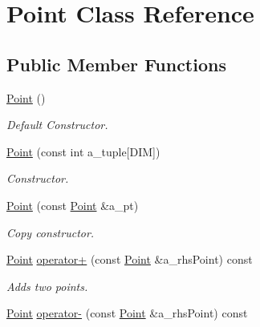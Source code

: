 \hypertarget{classPoint}{}\section{Point Class Reference}
\label{classPoint}
\subsection*{Public Member Functions}
\begin{DoxyCompactItemize}
\item 
\hypertarget{classPoint_ad92f2337b839a94ce97dcdb439b4325a}{}\hyperlink{classPoint_ad92f2337b839a94ce97dcdb439b4325a}{Point} ()\label{classPoint_ad92f2337b839a94ce97dcdb439b4325a}

\begin{DoxyCompactList}\small\item\em Default Constructor. \end{DoxyCompactList}\item 
\hypertarget{classPoint_ad2979175ac77062182ecfae283c8b97f}{}\hyperlink{classPoint_ad2979175ac77062182ecfae283c8b97f}{Point} (const int a\+\_\+tuple\mbox{[}D\+I\+M\mbox{]})\label{classPoint_ad2979175ac77062182ecfae283c8b97f}

\begin{DoxyCompactList}\small\item\em Constructor. \end{DoxyCompactList}\item 
\hypertarget{classPoint_ad3049b9597a2dc93be3fc304bbf3cdbb}{}\hyperlink{classPoint_ad3049b9597a2dc93be3fc304bbf3cdbb}{Point} (const \hyperlink{classPoint}{Point} \&a\+\_\+pt)\label{classPoint_ad3049b9597a2dc93be3fc304bbf3cdbb}

\begin{DoxyCompactList}\small\item\em Copy constructor. \end{DoxyCompactList}\item 
\hypertarget{classPoint_a52e66dbfdd8eb6929caf289af61d182a}{}\hyperlink{classPoint}{Point} \hyperlink{classPoint_a52e66dbfdd8eb6929caf289af61d182a}{operator+} (const \hyperlink{classPoint}{Point} \&a\+\_\+rhs\+Point) const \label{classPoint_a52e66dbfdd8eb6929caf289af61d182a}

\begin{DoxyCompactList}\small\item\em Adds two points. \end{DoxyCompactList}\item 
\hypertarget{classPoint_ad93f0f1d1a4247ade4e08f2e546f6fcf}{}\hyperlink{classPoint}{Point} \hyperlink{classPoint_ad93f0f1d1a4247ade4e08f2e546f6fcf}{operator-\/} (const \hyperlink{classPoint}{Point} \&a\+\_\+rhs\+Point) const \label{classPoint_ad93f0f1d1a4247ade4e08f2e546f6fcf}


\end{DoxyCompactItemize}
